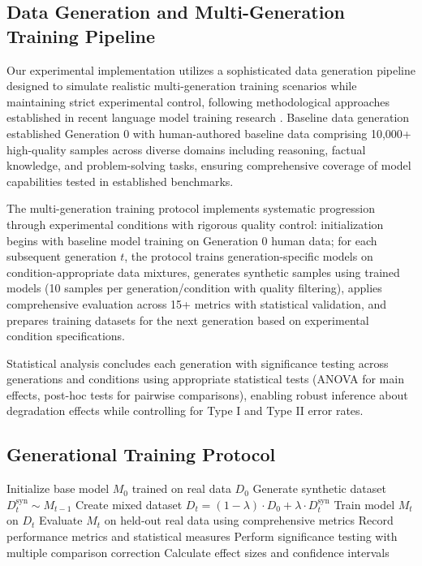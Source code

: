 \documentclass{article}
\begin{document}
\subsection{Data Generation and Multi-Generation Training Pipeline}

Our experimental implementation utilizes a sophisticated data generation pipeline designed to simulate realistic multi-generation training scenarios while maintaining strict experimental control, following methodological approaches established in recent language model training research \cite{ouyang2022training}. Baseline data generation established Generation 0 with human-authored baseline data comprising 10,000+ high-quality samples across diverse domains including reasoning, factual knowledge, and problem-solving tasks, ensuring comprehensive coverage of model capabilities tested in established benchmarks.

The multi-generation training protocol implements systematic progression through experimental conditions with rigorous quality control: initialization begins with baseline model training on Generation 0 human data; for each subsequent generation $t$, the protocol trains generation-specific models on condition-appropriate data mixtures, generates synthetic samples using trained models (10 samples per generation/condition with quality filtering), applies comprehensive evaluation across 15+ metrics with statistical validation, and prepares training datasets for the next generation based on experimental condition specifications.

Statistical analysis concludes each generation with significance testing across generations and conditions using appropriate statistical tests (ANOVA for main effects, post-hoc tests for pairwise comparisons), enabling robust inference about degradation effects while controlling for Type I and Type II error rates.

\subsection{Generational Training Protocol}

\begin{algorithm}
\caption{Digital Inbreeding Simulation}
\begin{algorithmic}[1]
\STATE Initialize base model $M_0$ trained on real data $D_0$
    \STATE Generate synthetic dataset $D_t^{\text{syn}} \sim M_{t-1}$
    \STATE Create mixed dataset $D_t = (1-\lambda) \cdot D_0 + \lambda \cdot D_t^{\text{syn}}$
    \STATE Train model $M_t$ on $D_t$
    \STATE Evaluate $M_t$ on held-out real data using comprehensive metrics
    \STATE Record performance metrics and statistical measures
    \STATE Perform significance testing with multiple comparison correction
    \STATE Calculate effect sizes and confidence intervals
\ENDFOR
\end{algorithmic}
\end{algorithm}
\end{document}
